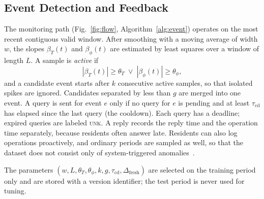 \documentclass[conference]{IEEEtran}
\begin{document}
\subsection{Event Detection and Feedback}
The monitoring path (Fig.~\ref{fig:flow}, Algorithm~\ref{alg:event}) operates on the most recent contiguous valid window. After smoothing with a moving average of width $w$, the slopes $\beta_T(t)$ and $\beta_\phi(t)$ are estimated by least squares over a window of length $L$. A sample is \emph{active} if
\begin{equation}
|\beta_T(t)|\ge\theta_T \;\lor\; |\beta_\phi(t)|\ge\theta_\phi ,
\label{eq:active}
\end{equation}
and a candidate event starts after $k$ consecutive active samples, so that isolated spikes are ignored. Candidates separated by less than $g$ are merged into one event. A query is sent for event $e$ only if no query for $e$ is pending and at least $\tau_{\mathrm{cd}}$ has elapsed since the last query (the cooldown). Each query has a deadline; expired queries are labeled \textsc{unk}. A reply records the reply time and the operation time separately, because residents often answer late. Residents can also log operations proactively, and ordinary periods are sampled as well, so that the dataset does not consist only of system-triggered anomalies~\cite{settles2009active}.

The parameters $(w, L, \theta_T, \theta_\phi, k, g, \tau_{\mathrm{cd}}, \Delta_{\mathrm{fresh}})$ are selected on the training period only and are stored with a version identifier; the test period is never used for tuning.
\end{document}
